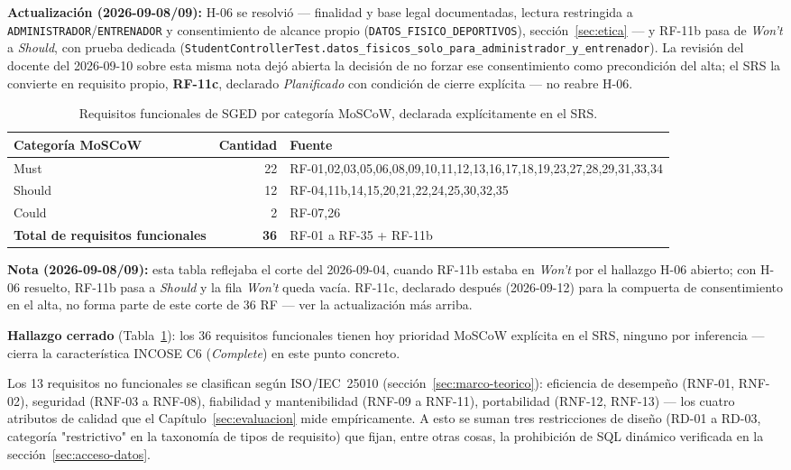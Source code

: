 \documentclass[11pt,a4paper]{article}
\begin{document}
\textbf{Actualización (2026-09-08/09):} H-06 se resolvió — finalidad y
base legal documentadas, lectura restringida a
\texttt{ADMINISTRADOR}/\texttt{ENTRENADOR} y consentimiento de alcance
propio (\texttt{DATOS\_FISICO\_DEPORTIVOS}), sección~\ref{sec:etica} —
y RF-11b pasa de \emph{Won't} a \emph{Should}, con prueba dedicada
(\texttt{StudentControllerTest.datos\_fisicos\_solo\_para\_administrador\_y\_entrenador}).
La revisión del docente del 2026-09-10 sobre esta misma nota dejó abierta
la decisión de no forzar ese consentimiento como precondición del alta;
el SRS la convierte en requisito propio, \textbf{RF-11c}, declarado
\emph{Planificado} con condición de cierre explícita — no reabre H-06.

\begin{table}[htbp]
\centering
\caption{Requisitos funcionales de SGED por categoría MoSCoW, declarada explícitamente en el SRS.}
\label{tab:moscow}
\begin{tabular}{@{}lrl@{}}
\toprule
\textbf{Categoría MoSCoW} & \textbf{Cantidad} & \textbf{Fuente} \\
\midrule
Must & 22 & RF-01,02,03,05,06,08,09,10,11,12,13,16,17,18,19,23,27,28,29,31,33,34 \\
Should & 12 & RF-04,11b,14,15,20,21,22,24,25,30,32,35 \\
Could & 2 & RF-07,26 \\
\midrule
\textbf{Total de requisitos funcionales} & \textbf{36} & RF-01 a RF-35 + RF-11b \\
\bottomrule
\end{tabular}
\end{table}

\textbf{Nota (2026-09-08/09):} esta tabla reflejaba el corte del
2026-09-04, cuando RF-11b estaba en \emph{Won't} por el hallazgo H-06
abierto; con H-06 resuelto, RF-11b pasa a \emph{Should} y la fila
\emph{Won't} queda vacía. RF-11c, declarado después (2026-09-12) para la
compuerta de consentimiento en el alta, no forma parte de este corte de
36 RF — ver la actualización más arriba.

\textbf{Hallazgo cerrado} (Tabla~\ref{tab:moscow}): los 36 requisitos
funcionales tienen hoy prioridad MoSCoW explícita en el SRS, ninguno
por inferencia — cierra la característica INCOSE C6 (\emph{Complete})
en este punto concreto.

Los 13 requisitos no funcionales se clasifican según ISO/IEC~25010
(sección~\ref{sec:marco-teorico}): eficiencia de desempeño (RNF-01,
RNF-02), seguridad (RNF-03 a RNF-08), fiabilidad y mantenibilidad
(RNF-09 a RNF-11), portabilidad (RNF-12, RNF-13) — los cuatro atributos
de calidad que el Capítulo~\ref{sec:evaluacion} mide empíricamente. A
esto se suman tres restricciones de diseño (RD-01 a RD-03, categoría
"restrictivo" en la taxonomía de tipos de requisito) que fijan, entre
otras cosas, la prohibición de SQL dinámico verificada en la
sección~\ref{sec:acceso-datos}.
\end{document}

